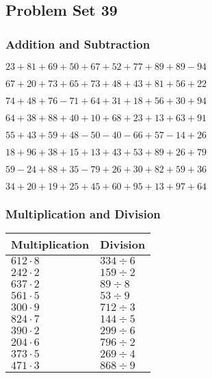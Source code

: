 \hypertarget{problem-set-39}{%
\subsection{Problem Set 39}\label{problem-set-39}}

\hypertarget{addition-and-subtraction}{%
\subsubsection{Addition and
Subtraction}\label{addition-and-subtraction}}

\(23+81+69+50+67+52+77+89+89-94\)

\(67+20+73+65+73+48+43+81+56+22\)

\(74+48+76-71+64+31+18+56+30+94\)

\(64+38+88+40+10+68+23+13+63+91\)

\(55+43+59+48-50-40-66+57-14+26\)

\(18+96+38+15+13+43+53+89+26+79\)

\(59-24+88+35-79+26+30+82+59+36\)

\(34+20+19+25+45+60+95+13+97+64\)

\hypertarget{multiplication-and-division}{%
\subsubsection{Multiplication and
Division}\label{multiplication-and-division}}

\begin{longtable}[]{@{}ll@{}}
\toprule
Multiplication & Division\tabularnewline
\midrule
\endhead
\(612\cdot8\) & \(334÷6\)\tabularnewline
\(242\cdot2\) & \(159÷2\)\tabularnewline
\(637\cdot2\) & \(89÷8\)\tabularnewline
\(561\cdot5\) & \(53÷9\)\tabularnewline
\(300\cdot9\) & \(712÷3\)\tabularnewline
\(824\cdot7\) & \(144÷5\)\tabularnewline
\(390\cdot2\) & \(299÷6\)\tabularnewline
\(204\cdot6\) & \(796÷2\)\tabularnewline
\(373\cdot5\) & \(269÷4\)\tabularnewline
\(471\cdot3\) & \(868÷9\)\tabularnewline
\bottomrule
\end{longtable}
